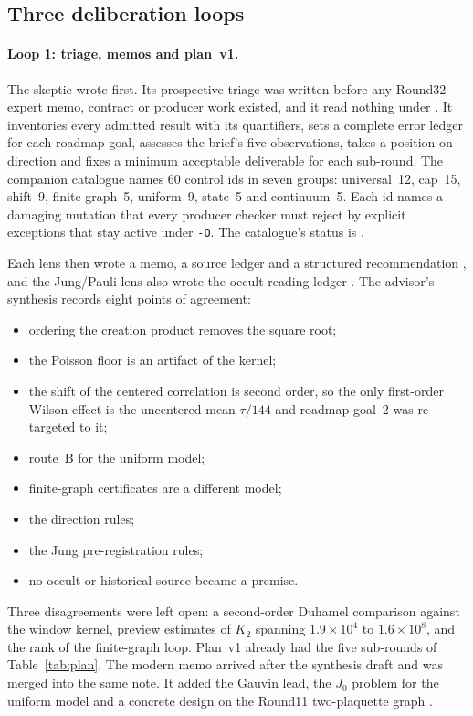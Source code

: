 \subsection{Three deliberation loops}
\label{sec:history-loops}

\paragraph{Loop 1: triage, memos and plan~v1.}
The skeptic wrote first. Its prospective triage was written before any
Round32 expert memo, contract or producer work existed, and it read nothing
under  \cite{r32skeptic}. It inventories every admitted
result with its quantifiers, sets a complete error ledger for each roadmap
goal, assesses the brief's five observations, takes a position on direction
and fixes a minimum acceptable deliverable for each sub-round. The companion
catalogue  names 60 control ids in seven
groups: universal~12, cap~15, shift~9, finite graph~5, uniform~9, state~5 and
continuum~5. Each id names a damaging mutation that every producer checker
must reject by explicit exceptions that stay active under \texttt{-O}. The
catalogue's status is
.

Each lens then wrote a memo, a source ledger and a structured recommendation
\cite{r32lenses}, and the Jung/Pauli lens also wrote the occult reading
ledger \cite{r32occult}. The advisor's synthesis records eight points of
agreement:
\begin{itemize}
\item ordering the creation product removes the square root;
\item the Poisson floor is an artifact of the kernel;
\item the shift of the centered correlation is second order, so the only
first-order Wilson effect is the uncentered mean $\tau/144$ and roadmap
goal~2 was re-targeted to it;
\item route~B for the uniform model;
\item finite-graph certificates are a different model;
\item the direction rules;
\item the Jung pre-registration rules;
\item no occult or historical source became a premise.
\end{itemize}
Three disagreements were left open: a second-order Duhamel comparison against
the window kernel, preview estimates of $K_2$ spanning $1.9\times10^4$ to
$1.6\times10^8$, and the rank of the finite-graph loop. Plan~v1 already had
the five sub-rounds of Table~\ref{tab:plan}. The modern memo arrived after the
synthesis draft and was merged into the same note. It added the Gauvin lead,
the $J_0$ problem for the uniform model and a concrete design on the Round11
two-plaquette graph \cite{r11}.

